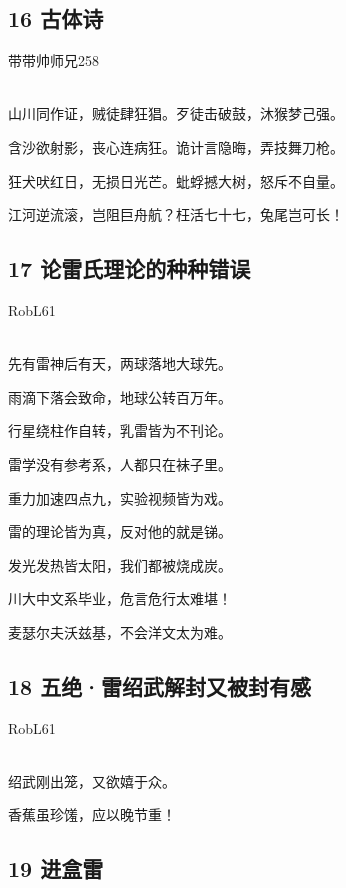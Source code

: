 \hypertarget{ux53e4ux4f53ux8bd7}{%
\subsection{16 古体诗}\label{ux53e4ux4f53ux8bd7}}

带带帅师兄258

~\\
山川同作证，贼徒肆狂猖。歹徒击破鼓，沐猴梦己强。

含沙欲射影，丧心连病狂。诡计言隐晦，弄技舞刀枪。

狂犬吠红日，无损日光芒。蚍蜉撼大树，怒斥不自量。

江河逆流滚，岂阻巨舟航？枉活七十七，兔尾岂可长！

\hypertarget{ux8bbaux96f7ux6c0fux7406ux8bbaux7684ux79cdux79cdux9519ux8bef}{%
\subsection{17
论雷氏理论的种种错误}\label{ux8bbaux96f7ux6c0fux7406ux8bbaux7684ux79cdux79cdux9519ux8bef}}

RobL61

~\\
先有雷神后有天，两球落地大球先。

雨滴下落会致命，地球公转百万年。

行星绕柱作自转，乳雷皆为不刊论。

雷学没有参考系，人都只在袜子里。

重力加速四点九，实验视频皆为戏。

雷的理论皆为真，反对他的就是锑。

发光发热皆太阳，我们都被烧成炭。

川大中文系毕业，危言危行太难堪！

麦瑟尔夫沃兹基，不会洋文太为难。

\hypertarget{ux4e94ux7eddux96f7ux7ecdux6b66ux89e3ux5c01ux53c8ux88abux5c01ux6709ux611f}{%
\subsection{18
五绝·雷绍武解封又被封有感}\label{ux4e94ux7eddux96f7ux7ecdux6b66ux89e3ux5c01ux53c8ux88abux5c01ux6709ux611f}}

RobL61

~\\
绍武刚出笼，又欲嬉于众。

香蕉虽珍馐，应以晚节重！

\hypertarget{ux8fdbux76d2ux96f7}{%
\subsection{19 进盒雷}\label{ux8fdbux76d2ux96f7}}

